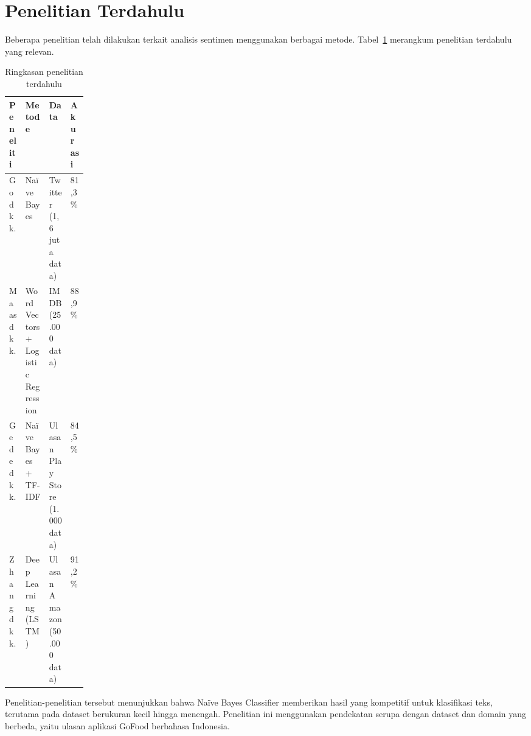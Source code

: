 \section{Penelitian Terdahulu}

Beberapa penelitian telah dilakukan terkait analisis sentimen menggunakan berbagai metode. Tabel~\ref{tab:prior-research} merangkum penelitian terdahulu yang relevan.

\begin{table}[H]
\centering
\caption{Ringkasan penelitian terdahulu}
\label{tab:prior-research}
\begin{tabularx}{\linewidth}{@{}p{0.15\linewidth}X X X@{}}
\toprule
Peneliti & Metode & Data & Akurasi \\
\midrule
Go dkk. \cite{go2019} & Na\"ive Bayes & Twitter (1,6 juta data) & 81,3\% \\
Maas dkk. \cite{maas2011} & Word Vectors + Logistic Regression & IMDB (25.000 data) & 88,9\% \\
Gede dkk. \cite{gewang2022} & Na\"ive Bayes + TF-IDF & Ulasan Play Store (1.000 data) & 84,5\% \\
Zhang dkk. \cite{zhang2020} & Deep Learning (LSTM) & Ulasan Amazon (50.000 data) & 91,2\% \\
\bottomrule
\end{tabularx}
\end{table}

Penelitian-penelitian tersebut menunjukkan bahwa Na\"ive Bayes Classifier memberikan hasil yang kompetitif untuk klasifikasi teks, terutama pada dataset berukuran kecil hingga menengah. Penelitian ini menggunakan pendekatan serupa dengan dataset dan domain yang berbeda, yaitu ulasan aplikasi GoFood berbahasa Indonesia.
